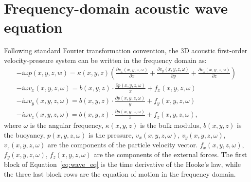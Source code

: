\documentclass[12pt]{article}
\begin{document}
\section{Frequency-domain acoustic wave equation}
Following standard Fourier transformation convention, the 3D acoustic first-order velocity-pressure system can be written in the frequency domain as:
\begin{equation}\label{eq:wave_eq}
	\begin{split}
	-i \omega p (x,y,z,w) = \kappa(x,y,z) \left(\frac{\partial v_x(x,y,z,\omega)}{\partial x} + \frac{\partial v_y(x,y,z,\omega)}{\partial y} + \frac{\partial v_z(x,y,z,\omega)}{\partial z} \right)\\
	-i \omega v_x(x,y,z,\omega) = b(x,y,z) \cdot \frac{\partial p(x,y,z,\omega)}{x} + f_x(x,y,z,\omega)\\
	-i \omega v_y(x,y,z,\omega) = b(x,y,z) \cdot \frac{\partial p(x,y,z,\omega)}{y} + f_y(x,y,z,\omega)\\
	-i \omega v_z(x,y,z,\omega) = b(x,y,z) \cdot \frac{\partial p(x,y,z,\omega)}{z} + f_z(x,y,z,\omega),
	\end{split}
\end{equation}
where $\omega$ is the angular frequency, $\kappa(x,y,z)$ is the bulk modulus, $b(x,y,z)$ is the buoyancy, $p(x,y,z,\omega)$ is the pressure, $v_x(x,y,z,\omega)$, $v_y(x,y,z,\omega)$, $v_z(x,y,z,\omega)$ are the components of the particle velocity vector. $f_x(x,y,z,\omega)$, $f_y(x,y,z,\omega)$, $f_z(x,y,z,\omega)$ are the components of the external forces. The first block of Equation~\ref{eq:wave_eq} is the time derivative of the Hooke's law, while the three last block rows are the equation of motion in the frequency domain.
\end{document}
